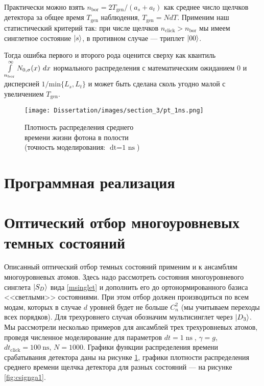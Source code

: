 Практически можно взять $n_{\text{bor}} = 2T_{\text{gen}}/(a_{s} + a_{t})$ как среднее число щелчков детектора за общее время $T_{\text{gen}}$ наблюдения, $T_{\text{gen}}=NdT$. Применим наш статистический критерий так: при числе щелчков $n_{\text{click}}>n_{\text{bor}}$ мы имеем синглетное состояние $|s\rangle$, в противном случае --- триплет $|00\rangle$. 

Тогда ошибка первого и второго рода оценится сверху как квантиль $\int\limits_{n_{\text{bor}}}^\infty N_{0,\sigma}(x)\ dx$ нормального распределения с математическим ожиданием $0$ и дисперсией $1/\text{min}\{L_s,L_t\}$ и может быть сделана сколь угодно малой с увеличением $T_{\text{gen}}$.

\begin{figure}[ht!]
	\noindent\centering\texttt{[image: Dissertation/images/section\_3/pt\_1ns.png]}
	\caption{
		Плотность распределения среднего\\времени жизни фотона в полости\\
		(точность моделирования: $\mathop{dt = 1~\text{ns}}$)
	}
	\label{fig:csignga}
\end{figure}

\clearpage
\section{Программная реализация}
\vspace{-3em}
\begin{figure}[h!]
	\noindent{}
\end{figure}

\clearpage
\section{Оптический отбор многоуровневых темных состояний}\label{sec:ch3/sect4}
\vspace{-3em}
Описанный оптический отбор темных состояний применим и к ансамблям многоуровневых атомов. Здесь надо рассмотреть состояния многоуровневого синглета $|S_{D}\rangle$ вида \eqref{msinglet}
и дополнить его до ортонормированного базиса <<светлыми>> состояниями. При этом отбор должен производиться по всем модам, которых в случае $d$ уровней будет не больше $C^{2}_{n}$ (мы учитываем переходы всех порядков). Для трехуровнего случая обозначим мультисинглет через $|D_3\rangle$. Мы рассмотрели несколько примеров для ансамблей трех трехуровневых атомов, проведя численное моделирование для параметров $dt = 1 \mathop{\text{ns}}$, $\gamma = g$, $dt_{\mathop{\text{click}}}=100\ \text{ns}$, $N = 1000$. 
Графики функции распределения времени срабатывания детектора даны на рисунке \ref{fig:csignga}, графики плотности распределения среднего времени щелчка детектора для разных состояний --- на рисунке \ref{fig:csignga1}.

